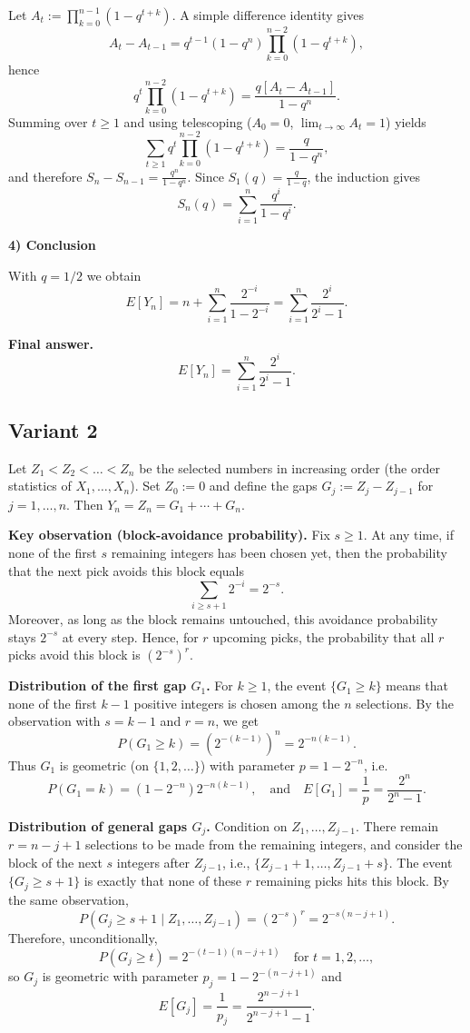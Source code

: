 \documentclass[12pt,a4paper]{article}
\theoremstyle{definition}
\begin{document}
    Let $A_t := \prod_{k=0}^{n-1}(1-q^{t+k})$. A simple difference identity gives
    $$A_t - A_{t-1} = q^{t-1}(1-q^n) \prod_{k=0}^{n-2}(1-q^{t+k}),$$
    hence
    $$q^t \prod_{k=0}^{n-2}(1-q^{t+k}) = \frac{q[A_t - A_{t-1}]}{1-q^n}.$$
    Summing over $t \geq 1$ and using telescoping ($A_0 = 0$, $\lim_{t \to \infty} A_t = 1$) yields
    $$\sum_{t \geq 1} q^t \prod_{k=0}^{n-2}(1-q^{t+k}) = \frac{q}{1-q^n},$$
    and therefore $S_n - S_{n-1} = \frac{q^n}{1-q^n}$. Since $S_1(q) = \frac{q}{1-q}$, the induction gives
    $$S_n(q) = \sum_{i=1}^n \frac{q^i}{1-q^i}.$$

    \textbf{4) Conclusion}

    With $q = 1/2$ we obtain
    $$E[Y_n] = n + \sum_{i=1}^n \frac{2^{-i}}{1-2^{-i}} = \sum_{i=1}^n \frac{2^i}{2^i-1}.$$

    \textbf{Final answer.}
    $$E[Y_n] = \sum_{i=1}^n \frac{2^i}{2^i-1}.$$
    \subsection{Variant 2}
    Let $Z_1 < Z_2 < \ldots < Z_n$ be the selected numbers in increasing order (the order statistics of $X_1, \ldots, X_n$). Set $Z_0 := 0$ and define the gaps $G_j := Z_j - Z_{j-1}$ for $j = 1, \ldots, n$. Then $Y_n = Z_n = G_1 + \cdots + G_n$.

    \textbf{Key observation (block-avoidance probability).}
    Fix $s \geq 1$. At any time, if none of the first $s$ remaining integers has been chosen yet, then the probability that the next pick avoids this block equals
    $$\sum_{i \geq s+1} 2^{-i} = 2^{-s}.$$
    Moreover, as long as the block remains untouched, this avoidance probability stays $2^{-s}$ at every step. Hence, for $r$ upcoming picks, the probability that all $r$ picks avoid this block is $(2^{-s})^r$.

    \textbf{Distribution of the first gap $G_1$.}
    For $k \geq 1$, the event $\{G_1 \geq k\}$ means that none of the first $k-1$ positive integers is chosen among the $n$ selections. By the observation with $s = k-1$ and $r = n$, we get
    $$P(G_1 \geq k) = (2^{-(k-1)})^n = 2^{-n(k-1)}.$$
    Thus $G_1$ is geometric (on $\{1, 2, \ldots\}$) with parameter $p = 1 - 2^{-n}$, i.e.
    $$P(G_1 = k) = (1 - 2^{-n}) 2^{-n(k-1)}, \quad \text{and} \quad E[G_1] = \frac{1}{p} = \frac{2^n}{2^n - 1}.$$

    \textbf{Distribution of general gaps $G_j$.}
    Condition on $Z_1, \ldots, Z_{j-1}$. There remain $r = n - j + 1$ selections to be made from the remaining integers, and consider the block of the next $s$ integers after $Z_{j-1}$, i.e., $\{Z_{j-1}+1, \ldots, Z_{j-1}+s\}$. The event $\{G_j \geq s+1\}$ is exactly that none of these $r$ remaining picks hits this block. By the same observation,
    $$P(G_j \geq s+1 \mid Z_1, \ldots, Z_{j-1}) = (2^{-s})^r = 2^{-s(n-j+1)}.$$
    Therefore, unconditionally,
    $$P(G_j \geq t) = 2^{-(t-1)(n-j+1)} \quad \text{for } t = 1, 2, \ldots,$$
    so $G_j$ is geometric with parameter $p_j = 1 - 2^{-(n-j+1)}$ and
    $$E[G_j] = \frac{1}{p_j} = \frac{2^{n-j+1}}{2^{n-j+1} - 1}.$$
\end{document}
